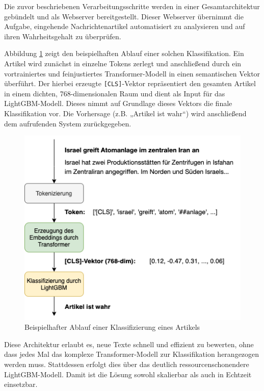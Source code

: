 Die zuvor beschriebenen Verarbeitungsschritte werden in einer Gesamtarchitektur gebündelt und als Webserver bereitgestellt. 
Dieser Webserver übernimmt die Aufgabe, eingehende Nachrichtenartikel automatisiert zu analysieren und auf ihren Wahrheitsgehalt zu überprüfen.

Abbildung \ref{fig:beispielablauf_gesamt} zeigt den beispielhaften Ablauf einer solchen Klassifikation. 
Ein Artikel wird zunächst in einzelne Tokens zerlegt und anschließend durch ein vortrainiertes und feinjustiertes Transformer-Modell in einen semantischen Vektor überführt. 
Der hierbei erzeugte \texttt{[CLS]}-Vektor repräsentiert den gesamten Artikel in einem dichten, 768-dimensionalen Raum und dient als Input für das LightGBM-Modell.
Dieses nimmt auf Grundlage dieses Vektors die finale Klassifikation vor. Die Vorhersage (z.B. „Artikel ist wahr“) wird anschließend dem aufrufenden System zurückgegeben.

\begin{figure}[htbp]
    \begin{center}
        \includegraphics[scale=0.6]{diagrams/beispielablauf_gesamt.png}
        \caption{\label{fig:beispielablauf_gesamt} Beispielhafter Ablauf einer Klassifizierung eines Artikels}
    \end{center}
\end{figure}

Diese Architektur erlaubt es, neue Texte schnell und effizient zu bewerten, ohne dass jedes Mal das komplexe Transformer-Modell zur Klassifikation herangezogen werden muss. 
Stattdessen erfolgt dies über das deutlich ressourcenschonendere LightGBM-Modell. Damit ist die Lösung sowohl skalierbar als auch in Echtzeit einsetzbar.


